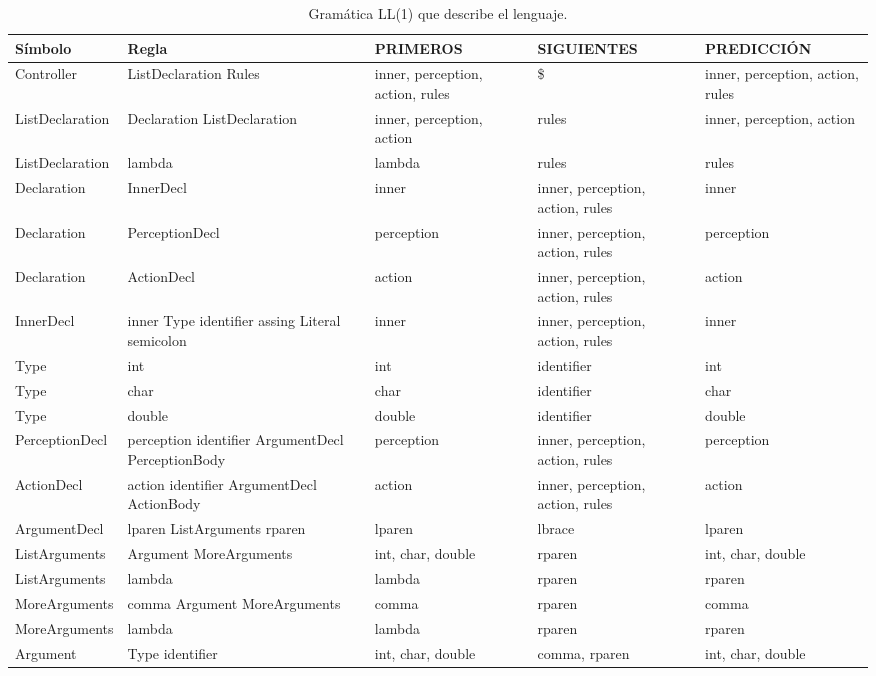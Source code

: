 

 \begin{table}[H]
   \centering
   \caption{Gramática LL(1) que describe el lenguaje.}
     \begin{tabularx}{\textwidth}{BBBBB}
     \toprule
     Símbolo & Regla & PRIMEROS & SIGUIENTES & PREDICCIÓN \\ \hline
     \midrule
           
     Controller & ListDeclaration Rules & inner, perception, action, rules & \$    & inner, perception, action, rules \\ \hline
     ListDeclaration & Declaration ListDeclaration & inner, perception, action & rules & inner, perception, action \\ \hline
     ListDeclaration & lambda & lambda & rules & rules \\ \hline
           
     Declaration & InnerDecl & inner & inner, perception, action, rules & inner \\ \hline
     Declaration & PerceptionDecl & perception & inner, perception, action, rules & perception \\ \hline
     Declaration & ActionDecl & action & inner, perception, action, rules & action \\ \hline
           
     InnerDecl & inner Type identifier assing Literal semicolon & inner & inner, perception, action, rules & inner \\ \hline
     Type  & int   & int   & identifier & int \\ \hline
     Type  & char  & char  & identifier & char \\ \hline
     Type  & double & double & identifier & double \\ \hline
           
     PerceptionDecl & perception identifier ArgumentDecl PerceptionBody & perception & inner, perception, action, rules & perception \\ \hline
     ActionDecl & action identifier ArgumentDecl ActionBody & action & inner, perception, action, rules & action \\ \hline
     ArgumentDecl & lparen ListArguments rparen & lparen & lbrace & lparen \\ \hline
     ListArguments & Argument MoreArguments & int, char, double & rparen & int, char, double \\ \hline
     ListArguments & lambda & lambda & rparen & rparen \\ \hline
     MoreArguments & comma Argument MoreArguments & comma & rparen & comma \\ \hline
     MoreArguments & lambda & lambda & rparen & rparen \\ \hline
     Argument & Type identifier & int, char, double & comma, rparen & int, char, double \\ \hline
           

\end{tabularx}
\end{table}
